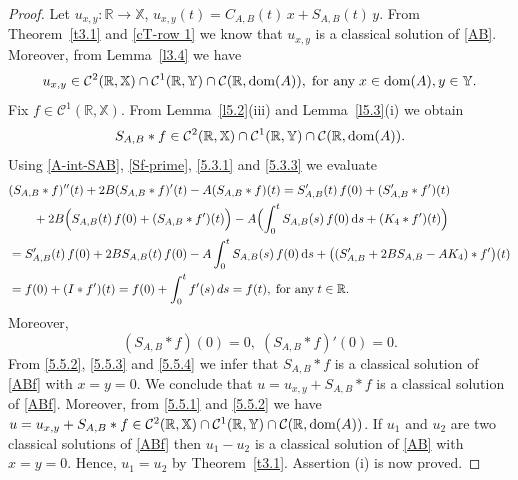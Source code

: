 \documentclass[11pt]{amsart}
\numberwithin{equation}{section}
\newcommand{\SAB}{S_{A,B}}
\newcommand{\RR}{{\mathbb R}}
\newcommand{\rmd}{{\mathrm{d}}}
\theoremstyle{remark}
\theoremstyle{definition}
\newcommand\bX{{\mathbb X}}
\newcommand\bY{{\mathbb Y}}
\newcommand{\dom}{\text{\rm{dom}}}
\begin{document}
\begin{proof}
	Let $u_{x,y}: \mathbb{R} \to \bX$, $u_{x,y}(t) = C_{A,B}(t)\,x + S_{A,B}(t)\,y$. From Theorem~\ref{t3.1} and \eqref{cT-row 1} we know that $u_{x,y}$ is a classical solution of \eqref{AB}. Moreover, from Lemma~\ref{l3.4} we have
	\begin{equation}\label{5.5.1} 
		u_{x,y} \in \mathcal{C}^2(\mathbb{R}, \bX) \cap \mathcal{C}^1(\mathbb{R}, \bY) \cap \mathcal{C}(\mathbb{R}, \dom(A)), \;\mbox{for any}\; x \in \dom(A), y \in \bY.
	\end{equation}
	Fix $f \in \mathcal{C}^1(\mathbb{R}, \bX)$. From Lemma~\ref{l5.2}(iii) and Lemma~\ref{l5.3}(i) we obtain
	\begin{equation}\label{5.5.2} 
		S_{A,B} * f \in \mathcal{C}^2(\mathbb{R}, \bX) \cap \mathcal{C}^1(\mathbb{R}, \bY) \cap \mathcal{C}(\mathbb{R}, \dom(A)).
	\end{equation}
	Using \eqref{A-int-SAB}, \eqref{Sf-prime}, \eqref{5.3.1} and \eqref{5.3.3} we evaluate
	\begin{align}\label{5.5.3}
		&(S_{A,B} * f)''(t) + 2B(S_{A,B} * f)'(t) - A(S_{A,B} * f)(t) = S_{A,B}'(t)\,f(0) + (S_{A,B}' * f')(t) \nonumber\\
		&\qquad+ 2B\Bigl(S_{A,B}(t)\,f(0) + (S_{A,B} * f')(t)\Bigr) - A\Bigl(\int_0^t S_{A,B}(s)\,f(0)\,\rmd s + (K_4 * f')(t)\Bigr)\nonumber\\
		&= S_{A,B}'(t)\,f(0) + 2B\SAB(t)\,f(0) - A\int_0^t S_{A,B}(s)\,f(0)\,\rmd s+\bigl((S_{A,B}' + 2B\SAB - AK_4) * f'\bigr)(t) \nonumber\\
		&= f(0) + (I * f')(t) = f(0) + \int_0^t f'(s)\,ds = f(t),\;\mbox{for any}\; t\in\RR.
	\end{align}
	Moreover,
	\begin{equation}\label{5.5.4} 
		(S_{A,B} * f)(0) = 0, \; (S_{A,B} * f)'(0) = 0.
	\end{equation}
	From \eqref{5.5.2}, \eqref{5.5.3} and \eqref{5.5.4} we infer that $S_{A,B} * f$ is a classical solution of \eqref{ABf} with $x = y = 0$. We conclude that $u = u_{x,y} + S_{A,B} * f$ is a classical solution of \eqref{ABf}. Moreover, from \eqref{5.5.1} and \eqref{5.5.2} we have $u = u_{x,y} + S_{A,B} * f \in \mathcal{C}^2(\mathbb{R}, \bX) \cap \mathcal{C}^1(\mathbb{R}, \bY) \cap \mathcal{C}(\mathbb{R}, \dom(A))$. If $u_1$ and $u_2$ are two classical solutions of \eqref{ABf} then $u_1 - u_2$ is a classical solution of \eqref{AB} with $x = y = 0$. Hence, $u_1 = u_2$ by Theorem~\ref{t3.1}. Assertion (i) is now proved.
	

\end{proof}
\end{document}
